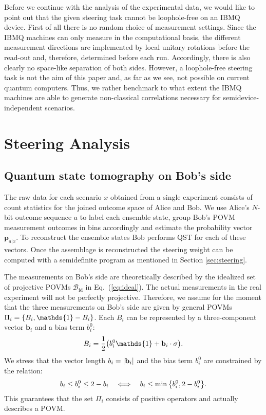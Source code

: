 \documentclass[aps,pra,twocolumn,superscriptaddress,showemail,showpacs,longbibliography]{revtex4-2}
\newcommand{\id}{\mathds{1}} %
\renewcommand{\vec}{\mathbf}
\begin{document}
Before we continue with the analysis of the experimental data, we would like to point out that the given steering task cannot be loophole-free on an IBMQ device. First of all there is no random choice of measurement settings. Since the IBMQ machines can only measure in the computational basis, the different measurement directions are implemented by local unitary rotations before the read-out and, therefore, determined before each run. Accordingly, there is also clearly no space-like separation of both sides. However, a loophole-free steering task is not the aim of this paper and, as far as we see, not possible on current quantum computers. Thus, we rather benchmark to what extent the IBMQ machines are able to generate non-classical correlations necessary for semidevice-independent scenarios.

\section{Steering Analysis}
\label{sec:analysis}

\subsection{Quantum state tomography on Bob's side}
\label{sub:tomo}


The raw data for each scenario $x$ obtained from a single experiment consists of count statistics for the joined outcome space of Alice and Bob. We use Alice's $N$-bit outcome sequence $a$ to label each ensemble state, group Bob's POVM measurement outcomes in bins accordingly and estimate the probability vector $\vec{p}_{a|x}$. To reconstruct the ensemble states Bob performs QST for each of these vectors. Once the assemblage is reconstructed the steering weight can be computed with a semidefinite program as mentioned in Section \ref{sec:steering}.

The measurements on Bob's side are theoretically described by the idealized set of projective POVMs $\mathcal{B}_\text{id}$ in Eq.~(\ref{eq:ideal}). The actual measurements in the real experiment will not be perfectly projective. Therefore, we assume for the moment that the three measurements on Bob's side are given by general POVMs $\Pi_i = \qty{B_i,\id-B_i}$.
Each $B_i$ can be represented by a three-component vector $\vec b_i$ and a bias term $b^0_i$:
\begin{equation}
    \label{eq:POVM_element}
    B_i = \frac{1}{2} \qty(b_i^0 \id + \vec b_i \cdot \vec \sigma).
\end{equation}
We stress that the vector length $b_i = \abs{\vec{b}_i}$ and the bias term $b^0_i$ are constrained by the relation:
\begin{equation}
    \label{eq:constraint}
    b_i \leq b^0_i \leq 2-b_i \quad \Longleftrightarrow \quad b_i \leq \min \qty{b^0_i, 2-b^0_i}.
\end{equation}
This guarantees that the set $\Pi_i$ consists of positive operators and actually describes a POVM.
\end{document}
